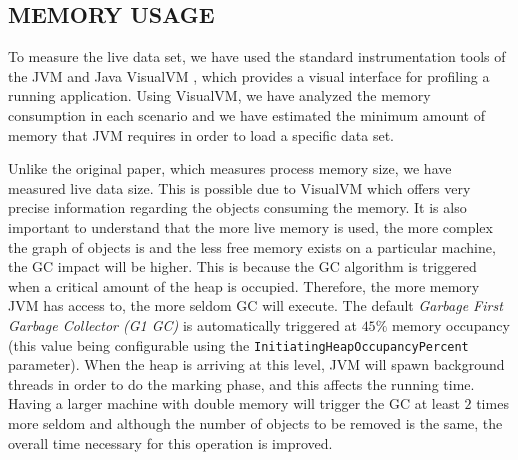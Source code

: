 \documentclass[a4paper,twoside]{article}
\begin{document}
\subsection{\uppercase{Memory Usage}}\label{subsec:uppercase8}
To measure the live data set, we have used the standard instrumentation tools of the JVM and
Java VisualVM \cite{visualvm:oracle}, which provides a visual interface for profiling a running application. Using VisualVM, we have analyzed the memory consumption in each scenario and we have estimated the minimum amount of memory that JVM requires in order to load a specific data set.

Unlike the original paper, which measures process memory size, we have measured live data size.  This is possible due to VisualVM which offers very precise information regarding the objects consuming the memory.
It is also important to understand that the more live memory is used, the more complex the graph of objects is and the less free memory exists on a particular machine, the GC impact will be higher.
This is because the GC algorithm is triggered when a critical amount of the heap is occupied.
Therefore, the more memory JVM has access to, the more seldom GC will execute.
The default {\it Garbage First Garbage Collector (G1 GC)} is automatically triggered at $45\%$ memory occupancy (this value being configurable using the \texttt{InitiatingHeapOccupancyPercent} parameter). When the heap is arriving at this level, JVM will spawn background threads in order to do the marking phase, and this affects the running time.
Having a larger machine with double memory will trigger the GC at least $2$ times more seldom and
although the number of objects to be removed is the same, the overall time necessary for this operation is improved.
\end{document}

